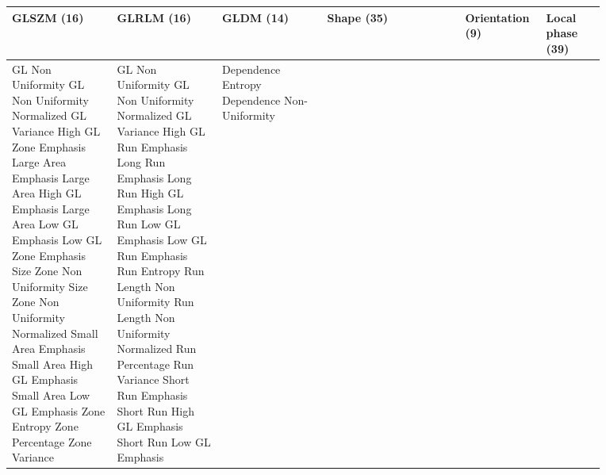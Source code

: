 \begin{table}
\begin{tabular}{@{}P{0.10\linewidth}P{0.10\linewidth}P{0.10\linewidth}P{0.21\linewidth}P{0.10\linewidth}P{0.09\linewidth}P{0.10\linewidth}@{}}
	\end{tabular}\par\nointerlineskip
	\begin{tabular}{@{}P{0.16\linewidth}P{0.16\linewidth}P{0.16\linewidth}P{0.21\linewidth}P{0.09\linewidth}P{0.09\linewidth}@{}}
		\midrule
		\textbf{GLSZM (16)} & \textbf{GLRLM (16)} & \textbf{GLDM (14)} & \textbf{Shape (35)} & \textbf{Orientation (9)} & \textbf{Local phase (39)} \\
		\midrule
		GL Non Uniformity \newline GL Non Uniformity Normalized \newline GL Variance \newline High GL Zone Emphasis \newline Large Area Emphasis \newline Large Area High GL Emphasis \newline Large Area Low GL Emphasis \newline Low GL Zone Emphasis \newline Size Zone Non Uniformity \newline Size Zone Non Uniformity Normalized \newline Small Area Emphasis \newline Small Area High GL Emphasis \newline Small Area Low GL Emphasis \newline Zone Entropy \newline Zone Percentage \newline Zone Variance & GL Non Uniformity \newline GL Non Uniformity Normalized \newline GL Variance \newline High GL Run Emphasis \newline Long Run Emphasis \newline Long Run High GL Emphasis \newline Long Run Low GL Emphasis \newline Low GL Run Emphasis \newline Run Entropy \newline Run Length Non Uniformity \newline Run Length Non Uniformity Normalized \newline Run Percentage \newline Run Variance \newline Short Run Emphasis \newline Short Run High GL Emphasis \newline Short Run Low GL Emphasis & Dependence Entropy \newline Dependence Non-Uniformity \newline 
\end{tabular}
\end{table}
